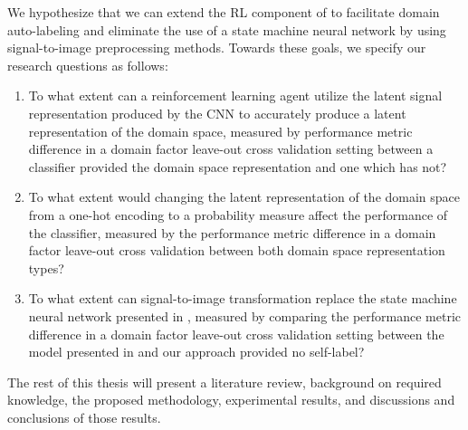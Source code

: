 We hypothesize that we can extend the RL component of \cite{ma2021location} to facilitate domain auto-labeling and eliminate the use of a state machine neural network by using signal-to-image preprocessing methods.
Towards these goals, we specify our research questions as follows:

\begin{enumerate}
	\item To what extent can a reinforcement learning agent utilize the latent signal representation produced by the CNN to accurately produce a latent representation of the domain space, measured by performance metric difference in a domain factor leave-out cross validation setting between a classifier provided the domain space representation and one which has not?
	\item To what extent would changing the latent representation of the domain space from a one-hot encoding to a probability measure affect the performance of the classifier, measured by the performance metric difference in a domain factor leave-out cross validation between both domain space representation types?
	\item To what extent can signal-to-image transformation replace the state machine neural network presented in \cite{ma2021location}, measured by comparing the performance metric difference in a domain factor leave-out cross validation setting between the model presented in \cite{ma2021location} and our approach provided no self-label?
\end{enumerate}

The rest of this thesis will present a literature review, background on required knowledge, the proposed methodology, experimental results, and discussions and conclusions of those results.